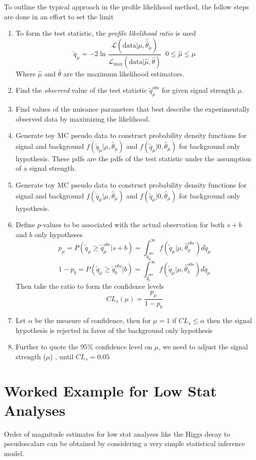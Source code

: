 To outline the typical approach in the profile likelihood method, the follow steps are done in an effort to set the limit
\begin{enumerate}
\item {To form the test statistic, the \textit{profile likelihood ratio} is used 
  \[\tilde{q}_\mu = -2 \ln \frac{\mathcal{L}(\text{data}|\mu,\hat{\hat{\theta}}_\mu)}{\mathcal{L}_\text{max}(\text{data}|\hat{\mu},\hat{\theta})} \;\; 0\leq \hat{\mu} \leq \mu \]
  Where $\hat{\mu}$ and $\hat{\theta}$ are the maximum likelihood estimators. 
  }
  \item Find the \textit{observed} value of the test statistic $\tilde{q}_\mu^{obs}$ for given signal strength $\mu$.
  \item Find values of the nuisance parameters that best describe the experimentally observed data by maximizing the likelihood.
  \item Generate toy MC pseudo data to construct probability density functions for signal and background $f(\tilde{q}_\mu|\mu,\hat{\theta}_\mu)$ and $f(\tilde{q}_\mu|0,\hat{\theta}_\mu)$ for background only hypothesis. These pdfs are the pdfs of the test statistic under the assumption of a signal strength.
  \item Generate toy MC pseudo data to construct probability density functions for signal and background $f(\tilde{q}_\mu|\mu,\hat{\theta}_\mu)$ and $f(\tilde{q}_\mu|0,\hat{\theta}_\mu)$ for background only hypothesis.
  \item {Define $p$-values to be associated with the actual observation for both $s+b$ and $b$ only hypotheses
  \[ p_\mu = P(\tilde{q}_\mu \ge \tilde{q}_\mu^{obs}| s+b) = \int_{\tilde{q}_\mu^{obs}}^\infty f(\tilde{q}_\mu |\mu,\hat{\theta}_\mu^{obs} ) d\tilde{q}_\mu\]
  \[ 1- p_b = P(\tilde{q}_\mu \ge \tilde{q}_b^{obs}| b) = \int_{\tilde{q}_b^{obs}}^\infty f(\tilde{q}_\mu |\mu,\hat{\theta}_b^{obs} ) d\tilde{q}_\mu\]
   Then take the ratio to form the confidence levels
  \[ CL_s (\mu)  = \frac{p_\mu}{1-p_b}\]
  }
  \item{ Let $\alpha$ be the measure of confidence, then for $\mu=1$ if $CL_s \leq \alpha$ then the signal hypothesis is rejected in favor of the background only hypothesis}
  \item {Further to quote the $95\%$ confidence level on $\mu$, we need to adjust the signal strength ($\mu$) , until $CL_s = 0.05$}
\end{enumerate}


\section{Worked Example for Low Stat Analyses}
Order of magnitude estimates for low stat analyses like the Higgs decay to pseudoscalars can be obtained by considering a very simple statistical inference model. 

